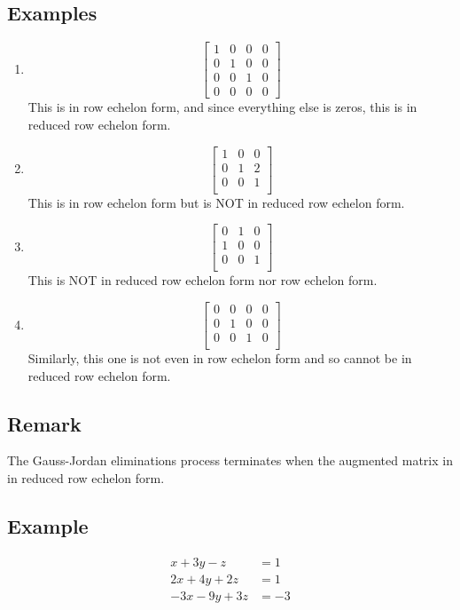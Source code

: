 \documentclass[11pt]{article}
\begin{document}
\subsection{Examples}
\begin{enumerate}[ (a) ]
\item 
\[
\begin{bmatrix}
1 & 0 & 0 & 0 \\
0 & 1 & 0 & 0 \\
0 & 0 & 1 & 0 \\
0 & 0 & 0 & 0
\end{bmatrix}
\]
This is in row echelon form, and since everything else is zeros, this is in reduced row echelon form.

\item
\[
\begin{bmatrix}
1 & 0 & 0 \\
0 & 1 & 2 \\
0 & 0 & 1 \\ 
\end{bmatrix}
\]
This is in row echelon form but is NOT in reduced row echelon form.

\item 
\[
\begin{bmatrix}
0 & 1 & 0 \\
1 & 0 & 0 \\
0 & 0 & 1 \\ 
\end{bmatrix}
\]
This is NOT in reduced row echelon form nor row echelon form.

\item
\[
\begin{bmatrix}
0 & 0 & 0 & 0 \\
0 & 1 & 0 & 0 \\
0 & 0 & 1 & 0 \\
\end{bmatrix}
\]
Similarly, this one is not even in row echelon form and so cannot be in reduced row echelon form.

\end{enumerate}

\subsection{Remark}
The Gauss-Jordan eliminations process terminates when the augmented matrix in in reduced row echelon form.

\subsection{Example}
\begin{align*}
x + 3y - z &= 1 \\
2x + 4y + 2z &= 1 \\
-3x - 9y + 3z &= -3 \\
\end{align*}
\end{document}

